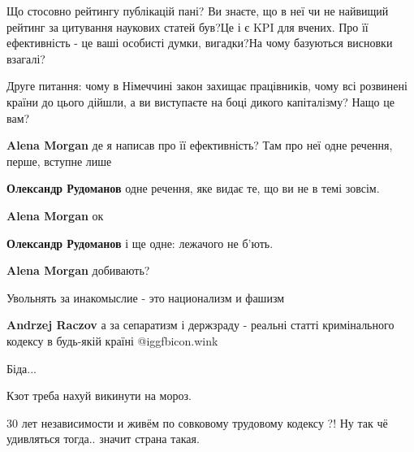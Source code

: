 \begin{itemize}

Що стосовно рейтингу публікацій пані? Ви знаєте, що в неї чи не найвищий
рейтинг за цитування наукових статей був?Це і є KPI для вчених. Про її
ефективність - це ваші особисті думки, вигадки?На чому базуються висновки
взагалі?

Друге питання: чому в Німеччині закон захищає працівників, чому всі розвинені
країни до цього дійшли, а ви виступаєте на боці дикого капіталізму? Нащо це
вам?

\begin{itemize} %
\textbf{Alena Morgan} де я написав про її ефективність? Там про неї одне речення, перше, вступне лише

\textbf{Олександр Рудоманов} одне речення, яке видає те, що ви не в темі зовсім.


\textbf{Alena Morgan} ок

\textbf{Олександр Рудоманов} і ще одне: лежачого не б'ють.


\textbf{Alena Morgan} добивають?
\end{itemize} %

Увольнять за инакомыслие - это национализм и фашизм

\begin{itemize} %
\textbf{Andrzej Raczov} а за сепаратизм і держзраду - реальні статті кримінального кодексу в будь-якій країні  @igg{fbicon.wink} 
\end{itemize} %

Біда...

Кзот треба нахуй викинути на мороз.

30 лет независимости и живём по совковому трудовому кодексу ?!
Ну так чё удивляться тогда.. значит страна такая.

\end{itemize} %

